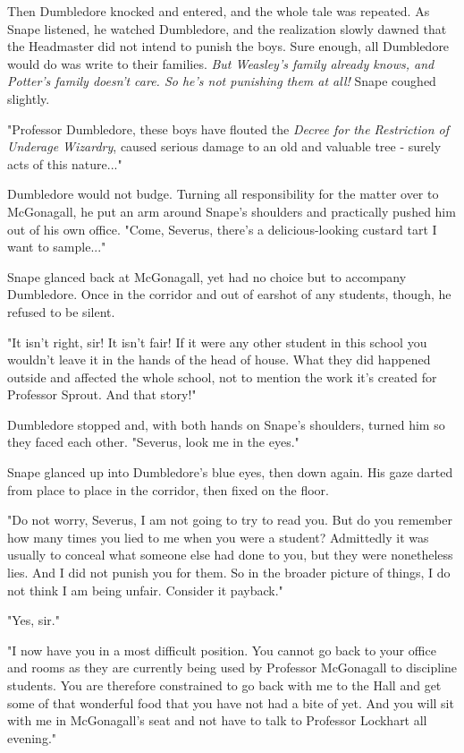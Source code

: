 \documentclass[a4paper,11pt]{article}
\begin{document}
Then Dumbledore knocked and entered, and the whole tale was repeated. As Snape listened, he watched Dumbledore, and the realization slowly dawned that the Headmaster did not intend to punish the boys. Sure enough, all Dumbledore would do was write to their families. \emph{But Weasley's family already knows, and Potter's family doesn't care. So he's not punishing them at all!} Snape coughed slightly.

"Professor Dumbledore, these boys have flouted the \emph{Decree for the Restriction of Underage Wizardry}, caused serious damage to an old and valuable tree - surely acts of this nature..."

Dumbledore would not budge. Turning all responsibility for the matter over to McGonagall, he put an arm around Snape's shoulders and practically pushed him out of his own office. "Come, Severus, there's a delicious-looking custard tart I want to sample..."

Snape glanced back at McGonagall, yet had no choice but to accompany Dumbledore. Once in the corridor and out of earshot of any students, though, he refused to be silent.

"It isn't right, sir! It isn't fair! If it were any other student in this school you wouldn't leave it in the hands of the head of house. What they did happened outside and affected the whole school, not to mention the work it's created for Professor Sprout. And that story!"

Dumbledore stopped and, with both hands on Snape's shoulders, turned him so they faced each other. "Severus, look me in the eyes."

Snape glanced up into Dumbledore's blue eyes, then down again. His gaze darted from place to place in the corridor, then fixed on the floor.

"Do not worry, Severus, I am not going to try to read you. But do you remember how many times you lied to me when you were a student? Admittedly it was usually to conceal what someone else had done to you, but they were nonetheless lies. And I did not punish you for them. So in the broader picture of things, I do not think I am being unfair. Consider it payback."

"Yes, sir."

"I now have you in a most difficult position. You cannot go back to your office and rooms as they are currently being used by Professor McGonagall to discipline students. You are therefore constrained to go back with me to the Hall and get some of that wonderful food that you have not had a bite of yet. And you will sit with me in McGonagall's seat and not have to talk to Professor Lockhart all evening."
\end{document}
